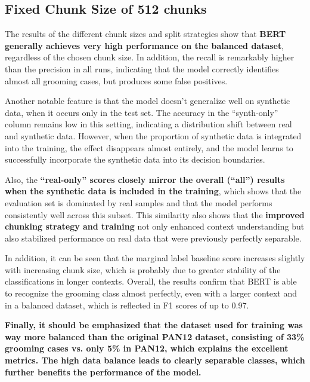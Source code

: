 \subsection{Fixed Chunk Size of 512 chunks}



The results of the different chunk sizes and split strategies show that \textbf{BERT generally achieves very high performance on the balanced dataset}, regardless of the chosen chunk size. In addition, the recall is remarkably higher than the precision in all runs, indicating that the model correctly identifies almost all grooming cases, but produces some false positives. 

Another notable feature is that the model doesn't generalize well on synthetic data, when it occurs only in the test set. The accuracy in the “synth-only” column remains low in this setting, indicating a distribution shift between real and synthetic data. However, when the proportion of synthetic data is integrated into the training, the effect disappears almost entirely, and the model learns to successfully incorporate the synthetic data into its decision boundaries.

Also, the \textbf{“real-only” scores closely mirror the overall (“all”) results when the synthetic data is included in the training}, which shows that the evaluation set is dominated by real samples and that the model performs consistently well across this subset. This similarity also shows that the \textbf{improved chunking strategy and training} not only enhanced context understanding but also stabilized performance on real data that were previously perfectly separable.

In addition, it can be seen that the marginal label baseline score increases slightly with increasing chunk size, which is probably due to greater stability of the classifications in longer contexts. Overall, the results confirm that BERT is able to recognize the grooming class almost perfectly, even with a larger context and in a balanced dataset, which is reflected in F1 scores of up to 0.97.

\textbf{Finally, it should be emphasized that the dataset used for training was way more balanced than the original PAN12 dataset, consisting of 33\% grooming cases vs. only 5\% in PAN12, which explains the excellent metrics. The high data balance leads to clearly separable classes, which further benefits the performance of the model.}



